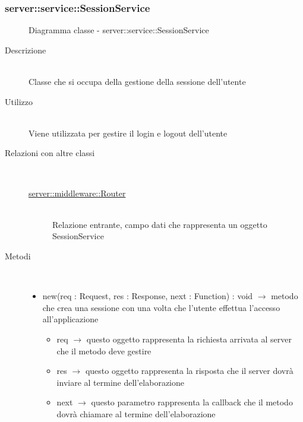 \subsubsection[SessionService]{server::service::SessionService}
\begin{figure}[H]
	\centering
	\caption{Diagramma classe - server::service::SessionService}
\end{figure}\begin{description}
\item[Descrizione] \hfill \\
Classe che si occupa della gestione della sessione dell'utente
\item[Utilizzo] \hfill \\
Viene utilizzata per gestire il login e logout dell'utente
\item[Relazioni con altre classi] \hfill \\
\vspace{-7mm}
\begin{description}
	\item[\hyperlink{server::middleware::Router}{server::middleware::Router}] \hfill \\
	Relazione entrante, campo dati che rappresenta un oggetto SessionService
\end{description}

\item[Metodi] \hfill \\
\vspace{-7mm}
\begin{itemize}
	\item new(req : Request, res : Response, next : Function) : void $\rightarrow$ metodo che crea una sessione con una volta che l'utente effettua l'accesso all'applicazione\begin{itemize}
		\item req $\rightarrow$ questo oggetto rappresenta la richiesta arrivata al server che il metodo deve gestire
		\item res $\rightarrow$ questo oggetto rappresenta la risposta che il server dovrà inviare al termine dell'elaborazione
		\item next $\rightarrow$ questo parametro rappresenta la callback che il metodo dovrà chiamare al termine dell’elaborazione
	\end{itemize}
	

\end{itemize}
\end{description}
